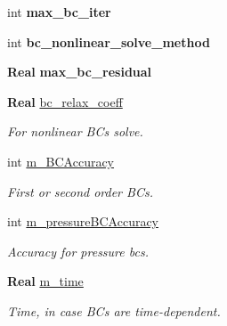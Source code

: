 \begin{DoxyCompactItemize}
int {\bfseries max\+\_\+bc\+\_\+iter}
\item 
\mbox{\label{class_mushy_layer_params_a7e7166ca5b2867c20a41d31fe0259b22}} 
int {\bfseries bc\+\_\+nonlinear\+\_\+solve\+\_\+method}
\item 
\mbox{\label{class_mushy_layer_params_a2747ee618dbc6d411939f0849e0dc7ea}} 
\textbf{ Real} {\bfseries max\+\_\+bc\+\_\+residual}
\item 
\mbox{\label{class_mushy_layer_params_abc635e34cb46ed18bdcbd4b1759b8a25}} 
\textbf{ Real} \hyperlink{class_mushy_layer_params_abc635e34cb46ed18bdcbd4b1759b8a25}{bc\+\_\+relax\+\_\+coeff}
\begin{DoxyCompactList}\small\item\em For nonlinear B\+Cs solve. \end{DoxyCompactList}\item 
\mbox{\label{class_mushy_layer_params_a0c73810c485b313090d83f1f0f6d44fa}} 
int \hyperlink{class_mushy_layer_params_a0c73810c485b313090d83f1f0f6d44fa}{m\+\_\+\+B\+C\+Accuracy}
\begin{DoxyCompactList}\small\item\em First or second order B\+Cs. \end{DoxyCompactList}\item 
\mbox{\label{class_mushy_layer_params_aa78cd01c27b8c35fe4e42a9ef75fdb54}} 
int \hyperlink{class_mushy_layer_params_aa78cd01c27b8c35fe4e42a9ef75fdb54}{m\+\_\+pressure\+B\+C\+Accuracy}
\begin{DoxyCompactList}\small\item\em Accuracy for pressure bcs. \end{DoxyCompactList}\item 
\mbox{\label{class_mushy_layer_params_a0b5cfae6cbb345071e9b37bb07eb5287}} 
\textbf{ Real} \hyperlink{class_mushy_layer_params_a0b5cfae6cbb345071e9b37bb07eb5287}{m\+\_\+time}
\begin{DoxyCompactList}\small\item\em Time, in case B\+Cs are time-\/dependent. \end{DoxyCompactList}\item 

\end{DoxyCompactItemize}

